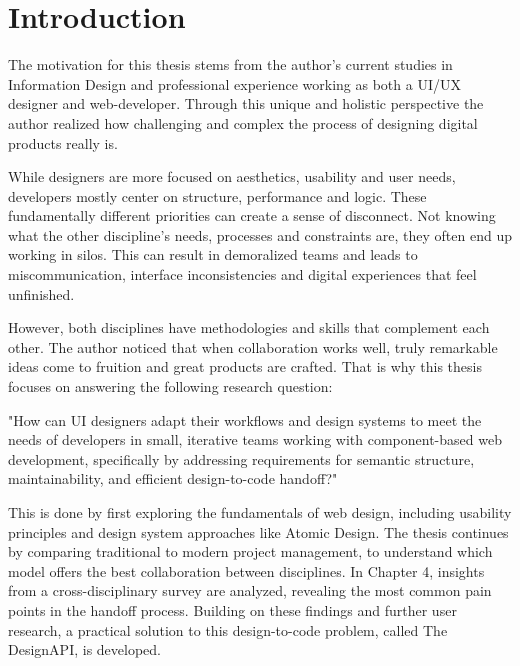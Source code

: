 \newpage
\section{Introduction}
The motivation for this thesis stems from the author's current studies in Information Design and
professional experience working as both a UI/UX designer and web-developer. Through this unique and
holistic perspective the author realized how challenging and complex the process of designing
digital products really is. 

While designers are more focused on aesthetics, usability and user needs, developers mostly center
on structure, performance and logic. These fundamentally different priorities can create a sense of
disconnect. Not knowing what the other discipline's needs, processes and constraints are, they often
end up working in silos. This can result in demoralized teams and leads to miscommunication,
interface inconsistencies and digital experiences that feel unfinished.

However, both disciplines have methodologies and skills that complement each other. The author
noticed that when collaboration works well, truly remarkable ideas come to fruition and great
products are crafted. That is why this thesis focuses on answering the following research question:

"How can UI designers adapt their workflows and design systems to meet the needs of developers in
small, iterative teams working with component-based web development, specifically by addressing
requirements for semantic structure, maintainability, and efficient design-to-code handoff?"

This is done by first exploring the fundamentals of web design, including usability principles and
design system approaches like Atomic Design. The thesis continues by comparing traditional to modern
project management, to understand which model offers the best collaboration between disciplines. In
Chapter 4, insights from a cross-disciplinary survey are analyzed, revealing the most common pain
points in the handoff process. Building on these findings and further user research, a practical
solution to this design-to-code problem, called The DesignAPI, is developed. 
